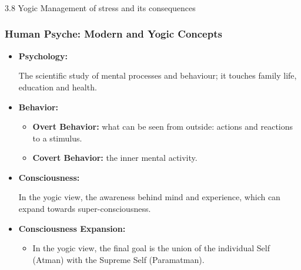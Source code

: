 \begin{frame}[fragile]\frametitle{}
\begin{center}
{\Large 3.8 Yogic Management of stress and its consequences}
\end{center}
\end{frame}

\begin{frame}[fragile]\frametitle{Human Psyche: Modern and Yogic Concepts}

      \begin{itemize}
        \item \textbf{Psychology:}
        
        The scientific study of mental processes and behaviour; it touches family life, education and health.

        \item \textbf{Behavior:}
        \begin{itemize}
            \item \textbf{Overt Behavior:} what can be seen from outside: actions and reactions to a stimulus.
            \item \textbf{Covert Behavior:} the inner mental activity.
        \end{itemize}
        \item \textbf{Consciousness:}
        
        In the yogic view, the awareness behind mind and experience, which can expand towards super-consciousness.
        
        \item \textbf{Consciousness Expansion:}
        \begin{itemize}
            \item In the yogic view, the final goal is the union of the individual Self (Atman) with the Supreme Self (Paramatman).
        \end{itemize}
      \end{itemize}

\end{frame}

